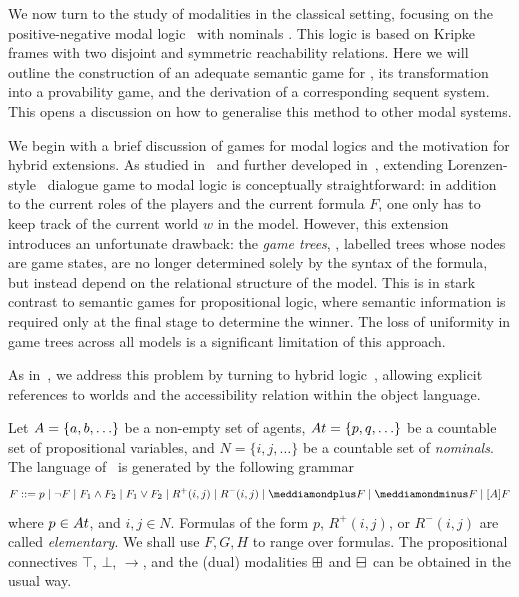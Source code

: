 
We now turn to the study of modalities in the classical setting, focusing on the positive-negative modal logic \PNL\ with nominals \cite{DBLP:journals/jolli/XiongA20,DBLP:journals/logcom/PedersenSA21}. This logic is based on Kripke frames with two disjoint and symmetric reachability relations. Here  we will outline the construction of an adequate semantic game for \PNL, its transformation into a provability game, and the derivation of a corresponding sequent system. This opens a discussion on how to generalise this method to other modal systems.

We begin with a brief discussion of games for modal logics and the motivation for hybrid extensions. As studied in~\cite{blackburn-synthese} and further developed in~\cite{Robert-PhD}, extending Lorenzen-style~\cite{Lorenzen1978-LORDLJ-2} dialogue game to modal logic is conceptually straightforward: in addition to the current roles of the players and the current formula $F$, one only has to  keep track of the current world $w$ in the model. However, this extension introduces an unfortunate drawback: the {\em game trees}, \ie, labelled trees whose nodes are game states, are no longer determined solely by the syntax of the formula, but instead depend on the relational structure of the model. This is in stark contrast to semantic games for propositional logic, where semantic information is required only at the final stage to determine the winner. The loss of uniformity in game trees across all models is a significant limitation of this approach.

As in~\cite{blackburn-synthese,DBLP:conf/wollic/Freiman21}, we address this problem by turning to hybrid logic~\cite{DBLP:journals/jolli/BlackburnS95,DBLP:journals/japll/BraunerP06,brauner2010hybrid}, allowing explicit references to worlds and the accessibility relation within the object language. 

Let $\A=\{\ag,\b,\ldots\}$ be a non-empty set of agents,
$\At=\{p,q,\ldots\}$ be a countable set of propositional variables, and $N=\{i,j,\ldots\}$ be a countable set of \emph{nominals}. The language of \PNL~is generated by the following grammar
$$F  ::= p  \mid \neg F  \mid F_1  \wedge F_2  \mid F_1  \vee F_2  \mid  R^+(i,j)\mid R^-(i,j) \mid  \dplus F  \mid \dminus F \mid [A]F $$
where $p\in \At$, and $i,j\in N$.  Formulas of the form $p$, $R^+(i,j)$, or $R^-(i,j)$ are called \emph{elementary}. We shall use $F,G,H$ to range over formulas. 
The propositional connectives $\top$, $\bot$, $\to$, and the (dual)  modalities $\boxplus$ and $\boxminus$ can be obtained in the usual way. 

